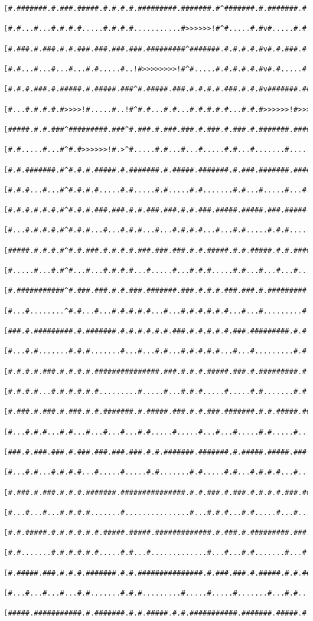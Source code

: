 \documentclass[a4paper,10pt,ngerman]{scrartcl}
\begin{document}
\begin{lstlisting}[frame=tb]
 [#.#######.#.###.#####.#.#.#.#.#########.#######.#^#######.#.#######.#.#########.#]
 [#.#...#...#.#.#.#.....#.#.#.#...........#>>>>>>!#^#.....#.#v#.....#.#.#.....#...#]
 [#.###.#.###.#.#.###.###.###.###.#########^#######.#.#.#.#.#v#.#.###.#.#.###.#.###]
 [#.#...#...#...#...#.#.....#..!#>>>>>>>>!#^#.....#.#.#.#.#.#v#.#.....#.#B<<#.#...#]
 [#.#.#.###.#.#####.#.#####.###^#.#####.###.#.#.#.#.###.#.#.#v#######.#####^#.###.#]
 [#...#.#.#.#.#>>>>!#.....#..!#^#.#...#.#...#.#.#.#.#...#.#.#>>>>>>!#>>>>>>^#.#...#]
 [#####.#.#.###^#########.###^#.###.#.###.###.#.###.#.###.#.#######.#########.#.#.#]
 [#.#.....#...#^#.#>>>>>>!#.>^#.....#.#...#...#.....#.#...#.......#.......#.#...#.#]
 [#.#.#######.#^#.#.#.#####.#.#######.#.#####.#######.#.###.#######.#####.#.#####.#]
 [#.#.#...#...#^#.#.#.#.....#.#.....#.#.....#.#.......#.#...#.....#...#...#...#...#]
 [#.#.#.#.#.#.#^#.#.#.###.###.#.#.###.###.#.#.###.#####.#####.###.#####.###.#.#.###]
 [#...#.#.#.#.#^#.#.#...#...#.#.#...#...#.#.#.#...#...#.#.....#.#.#.....#...#.#.#.#]
 [#####.#.#.#.#^#.#.###.#.#.#.#.###.###.###.#.#.#####.#.#.#####.#.#.#####.###.#.#.#]
 [#.....#...#.#^#...#...#.#.#.#...#.....#...#.#.#.....#.#...#...#...#.....#.#.#.#.#]
 [#.###########^#.###.###.#.#.###.#######.###.#.#.#.###.###.#.#########.###.#.#.#.#]
 [#...#........^#.#...#...#.#.#.#.#...#...#.#.#.#.#.#...#...#.........#.#...#.#.#.#]
 [###.#.#########.#.#######.#.#.#.#.#.#.###.#.#.#.#.#.###.#########.#.#.#.#.#.#.#.#]
 [#...#.#.......#.#.#.......#...#...#.#...#.#.#.#.#...#...#.........#.#.#.#...#.#.#]
 [#.#.#.#.###.#.#.#.#.###############.###.#.#.#.#####.###.#.#########.#.###.###.#.#]
 [#.#.#.#...#.#.#.#.#.#.........#.....#...#.#.#.....#.....#.#.......#.#...#.#.#.#.#]
 [#.###.#.###.#.###.#.#.#######.#.#####.###.#.#.###.#######.#.#.#####.###.#.#.#.#.#]
 [#...#.#.#...#.#...#...#...#...#.#.....#.....#...#...#.....#.#.....#...#.#...#.#.#]
 [###.#.###.###.#.###.###.###.###.#.#.#######.#######.#.#####.#####.###.#.#####.#.#]
 [#...#.#...#.#.#.#...#.....#.....#.#.......#.#.....#.#...#.#.#.#...#...#.#.....#.#]
 [#.###.#.###.#.#.#.#######.###############.#.#.###.#.###.#.#.#.#.###.###.#.#####.#]
 [#...#...#...#.#.#.#.......#...............#...#.#.#...#.#.....#...#...#.#.#.....#]
 [#.#.#####.#.#.#.#.#.#.#####.#####.#############.#.###.#.#########.###.#.#.#####.#]
 [#.#.......#.#.#.#.#.#.....#.#...#.............#...#...#.#.......#...#...#.....#.#]
 [#.#####.###.#.#.#.#######.#.#.###############.#.###.###.#.#####.#.#.###.#####.#.#]
 [#...#...#...#...#.#.......#.#.#.........#.....#.....#.......#...#.#...#.#...#...#]
 [#####.###########.#.#######.#.#.#####.#.#.###########.#######.#####.#.#.#.#.###.#]

\end{lstlisting}
\end{document}
